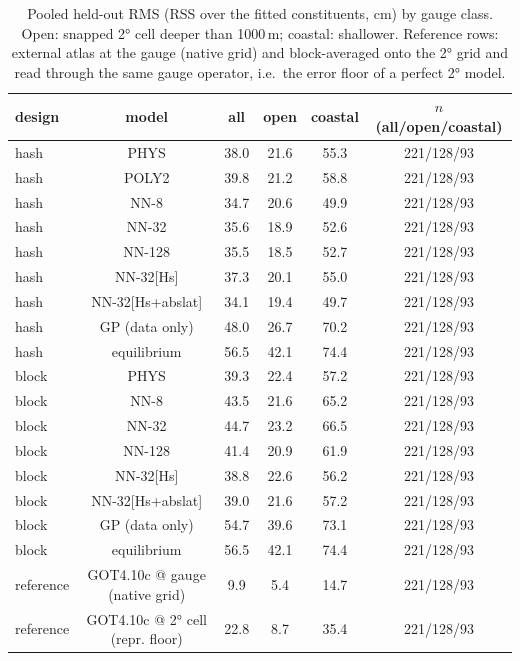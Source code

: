 \begin{table}[t]\centering\footnotesize
\caption{Pooled held-out RMS (RSS over the fitted constituents, cm) by gauge class. Open: snapped 2° cell deeper than 1000\,m; coastal: shallower. Reference rows: external atlas at the gauge (native grid) and block-averaged onto the 2° grid and read through the same gauge operator, i.e.\ the error floor of a perfect 2° model.}
\label{tab:benchmark}
\begin{tabular}{lccccc}
\toprule
design & model & all & open & coastal & $n$ (all/open/coastal) \\
\midrule
hash & PHYS & 38.0 & 21.6 & 55.3 & 221/128/93 \\
hash & POLY2 & 39.8 & 21.2 & 58.8 & 221/128/93 \\
hash & NN-8 & 34.7 & 20.6 & 49.9 & 221/128/93 \\
hash & NN-32 & 35.6 & 18.9 & 52.6 & 221/128/93 \\
hash & NN-128 & 35.5 & 18.5 & 52.7 & 221/128/93 \\
hash & NN-32[Hs] & 37.3 & 20.1 & 55.0 & 221/128/93 \\
hash & NN-32[Hs+abslat] & 34.1 & 19.4 & 49.7 & 221/128/93 \\
hash & GP (data only) & 48.0 & 26.7 & 70.2 & 221/128/93 \\
hash & equilibrium & 56.5 & 42.1 & 74.4 & 221/128/93 \\
block & PHYS & 39.3 & 22.4 & 57.2 & 221/128/93 \\
block & NN-8 & 43.5 & 21.6 & 65.2 & 221/128/93 \\
block & NN-32 & 44.7 & 23.2 & 66.5 & 221/128/93 \\
block & NN-128 & 41.4 & 20.9 & 61.9 & 221/128/93 \\
block & NN-32[Hs] & 38.8 & 22.6 & 56.2 & 221/128/93 \\
block & NN-32[Hs+abslat] & 39.0 & 21.6 & 57.2 & 221/128/93 \\
block & GP (data only) & 54.7 & 39.6 & 73.1 & 221/128/93 \\
block & equilibrium & 56.5 & 42.1 & 74.4 & 221/128/93 \\
reference & GOT4.10c @ gauge (native grid) & 9.9 & 5.4 & 14.7 & 221/128/93 \\
reference & GOT4.10c @ 2° cell (repr. floor) & 22.8 & 8.7 & 35.4 & 221/128/93 \\
\bottomrule
\end{tabular}
\end{table}
